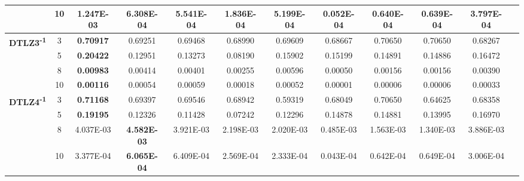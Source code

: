 \documentclass{sig-alternate}
\begin{document}
\begin{table*}[!htb]
\begin{tabular}{|c|c|c|c|c|c|c|c|c|c|c|c|}
                                                      & 10         & \textbf{1.247E-03} & 6.308E-04          & 5.541E-04             & 1.836E-04        & 5.199E-04           & 0.052E-04           & 0.640E-04          & 0.639E-04            & 3.797E-04          \\ \hline
\multirow{4}{*}{\textbf{DTLZ3\textsuperscript{-1}}} & 3          & \textbf{0.70917}   & 0.69251            & 0.69468               & 0.68990          & 0.69609             & 0.68667             & 0.70650            & 0.70650              & 0.68267            \\ \cline{2-11} 
                                                      & 5          & \textbf{0.20422}   & 0.12951            & 0.13273               & 0.08190          & 0.15902             & 0.15199             & 0.14891            & 0.14886              & 0.16472            \\ \cline{2-11} 
                                                      & 8          & \textbf{0.00983}   & 0.00414            & 0.00401               & 0.00255          & 0.00596             & 0.00050             & 0.00156            & 0.00156              & 0.00390            \\ \cline{2-11} 
                                                      & 10         & \textbf{0.00116}   & 0.00054            & 0.00059               & 0.00018          & 0.00052             & 0.00001             & 0.00006            & 0.00006              & 0.00033            \\ \hline
\multirow{4}{*}{\textbf{DTLZ4\textsuperscript{-1}}} & 3          & \textbf{0.71168}   & 0.69397            & 0.69546               & 0.68942          & 0.59319             & 0.68049             & 0.70650            & 0.64625              & 0.68358            \\ \cline{2-11} 
                                                      & 5          & \textbf{0.19195}   & 0.12326            & 0.11428               & 0.07242          & 0.12296             & 0.14878             & 0.14881            & 0.13995              & 0.16970            \\ \cline{2-11} 
                                                      & 8          & 4.037E-03          & \textbf{4.582E-03} & 3.921E-03             & 2.198E-03        & 2.020E-03           & 0.485E-03           & 1.563E-03          & 1.340E-03            & 3.886E-03          \\ \cline{2-11} 
                                                      & 10         & 3.377E-04          & \textbf{6.065E-04} & 6.409E-04             & 2.569E-04        & 2.333E-04           & 0.043E-04           & 0.642E-04          & 0.649E-04            & 3.006E-04          \\ \hline

\end{tabular}
\end{table*}
\end{document}
